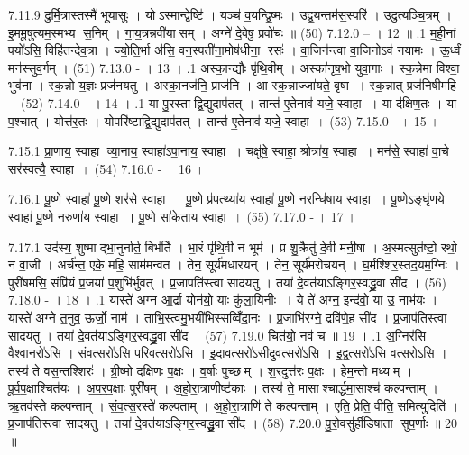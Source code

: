 7.11.9
दु॒र्मि॒त्रास्तस्मै॑ भूयासुः । योऽस्मान्द्वेष्टि॑ । यञ्च॑ व॒यन्द्वि॒ष्मः । उद्व॒यन्तम॑स॒स्परि॑ । उदु॒त्यञ्चि॒त्रम् । इ॒ममू॒षुत्यम॒स्मभ्य स॒निम् । गा॒य॒त्रन्नवी॑यासम् । अग्ने॑ दे॒वेषु॒ प्रवो॑चः ॥ (50)
7.12.0
-- । 12 ॥
.1
म॒ही॒नां पयो॑ऽसि॒ विहि॑तन्देव॒त्रा । ज्यो॒ति॒र्भा अ॑सि॒ वन॒स्पती॑ना॒मोष॑धीना॒ रसः॑ । वा॒जिन॑न्त्वा वा॒जिनोऽव॑ नयामः । ऊ॒र्ध्वं मन॑स्सुव॒र्गम् । (51)
7.13.0
- । 13 ।
.1
अस्का॒न्द्यौः पृ॑थि॒वीम् । अस्का॑नृष॒भो युवा॒गाः । स्क॒न्नेमा विश्वा॒ भुव॑ना । स्क॒न्नो य॒ज्ञः प्रज॑नयतु । अस्का॒नज॑नि॒ प्राज॑नि । आ स्क॒न्नाज्जा॑यते॒ वृषा । स्क॒न्नात् प्रज॑निषीमहि । (52)
7.14.0
- । 14 ।
.1
या पु॒रस्ताद्वि॒द्युदाप॑तत् । तान्त॑ ए॒तेनाव॑ यजे॒ स्वाहा । या द॑क्षिण॒तः । या प॒श्चात् । योत्त॑र॒तः । योपरि॑ष्टाद्वि॒द्युदाप॑तत् । तान्त॑ ए॒तेनाव॑ यजे॒ स्वाहा । (53)
7.15.0
- । 15 ।
\anuvakamend

7.15.1
प्रा॒णाय॒ स्वाहा व्या॒नाय॒ स्वाहा॑ऽपा॒नाय॒ स्वाहा । चक्षु॑षे॒ स्वाहा॒ श्रोत्रा॑य॒ स्वाहा । मन॑से॒ स्वाहा॑ वा॒चे सर॑स्वत्यै॒ स्वाहा । (54)
7.16.0
- । 16 ।
\anuvakamend


7.16.1
पू॒ष्णे स्वाहा॑ पू॒ष्णे शर॑से॒ स्वाहा । पू॒ष्णे प्र॑प॒त्थ्या॑य॒ स्वाहा॑ पू॒ष्णे न॒रन्धि॑षाय॒ स्वाहा । पू॒ष्णेऽङ्घृ॑णये॒ स्वाहा॑ पू॒ष्णे न॒रुणा॑य॒ स्वाहा । पू॒ष्णे सा॑के॒ताय॒ स्वाहा । (55)
7.17.0
- । 17 ।
\anuvakamend

7.17.1
उद॑स्य॒ शुष्माद्भा॒नुर्नार्त॒ बिभ॑र्ति । भा॒रं पृ॑थि॒वी न भूम॑ । प्र शु॒क्रैतु॑ दे॒वी म॑नी॒षा । अ॒स्मत्सुत॑ष्टो॒ रथो॒ न वा॒जी । अर्च॑न्त॒ एके॒ महि॒ साम॑मन्वत । तेन॒ सूर्य॑मधारयन् । तेन॒ सूर्य॑मरोचयन् । घ॒र्मश्शिर॒स्तद॒यम॒ग्निः । पुरी॑षमसि॒ संप्रि॑यं प्र॒जया॑ प॒शुभि॑र्भुवत् । प्र॒जापति॑स्त्वा सादयतु । तया॑ दे॒वत॑याऽङ्गिर॒स्वद्ध्रु॒वा सी॑द । (56)
7.18.0
- । 18 ।
.1
यास्ते॑ अग्न आ॒र्द्रा योन॑यो॒ याः कु॑ला॒यिनीः । ये ते॑ अग्न॒ इन्द॑वो॒ या उ॒ नाभ॑यः । यास्ते॑ अग्ने त॒नुव॒ ऊर्जो॒ नाम॑ । ताभि॒स्त्वमु॒भयी॑भिस्सव्विँदा॒नः । प्र॒जाभि॑रग्ने॒ द्रवि॑णे॒ह सी॑द । प्र॒जाप॑तिस्त्वा सादयतु । तया॑ दे॒वत॑याऽङ्गिर॒स्वद्ध्रु॒वा सी॑द । (57)
7.19.0
चित॑यो॒ नव॑ च ॥ 19 ।
.1
अ॒ग्निर॑सि वैश्वान॒रो॑ऽसि । सं॒व॒त्स॒रो॑ऽसि परिवत्स॒रो॑ऽसि । इ॒दा॒व॒त्स॒रो॑ऽसीदुवत्स॒रो॑ऽसि । इ॒द्व॒त्स॒रो॑ऽसि वत्स॒रो॑ऽसि । तस्य॑ ते वस॒न्तश्शिरः॑ । ग्री॒ष्मो दक्षि॑णः प॒क्षः । व॒र्\mbox{}षाः पुच्छम् । श॒रदुत्त॑रः प॒क्षः । हे॒म॒न्तो मध्यम् । पू॒र्व॒प॒क्षाश्चित॑यः । अ॒प॒र॒प॒क्षाः पुरी॑षम् । अ॒हो॒रा॒त्राणीष्ट॑काः । तस्य॑ ते॒ मासाश्चार्द्धमा॒साश्च॑ कल्पन्ताम् । ऋ॒तव॑स्ते कल्पन्ताम् । सं॒व॒त्स॒रस्ते॑ कल्पताम् । अ॒हो॒रा॒त्राणि॑ ते कल्पन्ताम् । एति॒ प्रेति॒ वीति॒ समित्युदिति॑ । प्र॒जाप॑तिस्त्वा सादयतु । तया॑ दे॒वत॑याऽङ्गिर॒स्वद्ध्रु॒वा सी॑द । (58)
7.20.0
पु॒रो॒वसु॑र्\mbox{}हीडिषाता सुप॒र्णाः ॥ 20 ॥
\anuvakamend

